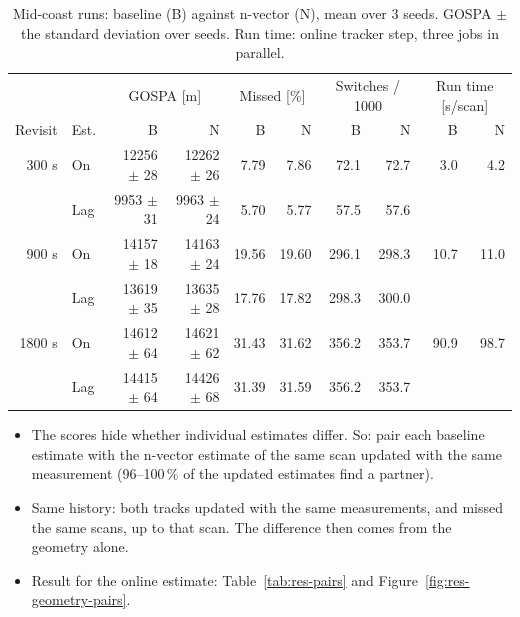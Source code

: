 \begin{table}[htbp]
\centering
\caption{Mid-coast runs: baseline (B) against n-vector (N), mean over 3 seeds. GOSPA $\pm$ the standard deviation over seeds. Run time: online tracker step, three jobs in parallel.}
\label{tab:res-3b}
\small
\begin{tabular}{r l r r r r r r r r}
\toprule
& & \multicolumn{2}{c}{GOSPA [m]} & \multicolumn{2}{c}{Missed [\%]} & \multicolumn{2}{c}{Switches / 1000} & \multicolumn{2}{c}{Run time [s/scan]} \\
Revisit & Est. & B & N & B & N & B & N & B & N \\
\midrule
300 s & On & 12256 $\pm$ 28 & 12262 $\pm$ 26 & 7.79 & 7.86 & 72.1 & 72.7 & 3.0 & 4.2 \\
 & Lag & 9953 $\pm$ 31 & 9963 $\pm$ 24 & 5.70 & 5.77 & 57.5 & 57.6 & & \\
900 s & On & 14157 $\pm$ 18 & 14163 $\pm$ 24 & 19.56 & 19.60 & 296.1 & 298.3 & 10.7 & 11.0 \\
 & Lag & 13619 $\pm$ 35 & 13635 $\pm$ 28 & 17.76 & 17.82 & 298.3 & 300.0 & & \\
1800 s & On & 14612 $\pm$ 64 & 14621 $\pm$ 62 & 31.43 & 31.62 & 356.2 & 353.7 & 90.9 & 98.7 \\
 & Lag & 14415 $\pm$ 64 & 14426 $\pm$ 68 & 31.39 & 31.59 & 356.2 & 353.7 & & \\
\bottomrule
\end{tabular}
\end{table}

\begin{itemize}
    \item The scores hide whether individual estimates differ. So: pair each baseline estimate with the n-vector estimate of the same scan updated with the same measurement (96--100\,\% of the updated estimates find a partner).
    \item Same history: both tracks updated with the same measurements, and missed the same scans, up to that scan. The difference then comes from the geometry alone.
    \item Result for the online estimate: Table~\ref{tab:res-pairs} and Figure~\ref{fig:res-geometry-pairs}.
\end{itemize}

